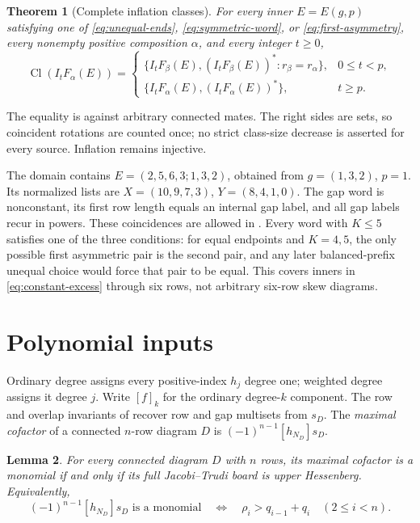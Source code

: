 \documentclass[11pt,a4paper]{amsart}
\numberwithin{equation}{section}
\theoremstyle{plain}
\newtheorem{theorem}{Theorem}[section]
\newtheorem{lemma}[theorem]{Lemma}
\theoremstyle{definition}
\begin{document}
\begin{theorem}[Complete inflation classes]\label{thm:main}
For every inner \(E=E(g,p)\) satisfying one of
\eqref{eq:unequal-ends}, \eqref{eq:symmetric-word}, or
\eqref{eq:first-asymmetry}, every nonempty positive composition
\(\alpha\), and every integer \(t\ge0\),
\begin{equation}\label{eq:main-class}
 \operatorname{Cl}(I_tF_\alpha(E))=
 \begin{cases}
 \{I_tF_\beta(E),(I_tF_\beta(E))^*:r_\beta=r_\alpha\},
       &0\le t<p,\\[1mm]
 \{I_tF_\alpha(E),(I_tF_\alpha(E))^*\},&t\ge p.
 \end{cases}
\end{equation}
\end{theorem}

The equality is against arbitrary connected mates.  The right sides are
sets, so coincident rotations are counted once; no strict class-size
decrease is asserted for every source.  Inflation remains injective.

The domain contains \(E=(2,5,6,3;1,3,2)\), obtained from
\(g=(1,3,2)\), \(p=1\).  Its normalized lists are
\(X=(10,9,7,3)\), \(Y=(8,4,1,0)\).  The gap word is
nonconstant, its first row length equals an internal gap label, and all
gap labels recur in powers.  These coincidences are allowed in
.  Every word with \(K\le5\) satisfies one of the
three conditions: for equal endpoints and \(K=4,5\), the only
possible first asymmetric pair is the second pair, and any later
balanced-prefix unequal choice would force that pair to be equal.
This covers inners in \eqref{eq:constant-excess} through six rows,
not arbitrary six-row skew diagrams.

\section{Polynomial inputs}\label{sec:inputs}

Ordinary degree assigns every positive-index \(h_j\) degree one;
weighted degree assigns it degree \(j\).  Write \([f]_k\) for the
ordinary degree-\(k\) component.  The row and overlap invariants of
\cite{Reiner2007Coincidences} recover row and gap multisets from
\(s_D\).  The \emph{maximal cofactor} of a connected \(n\)-row diagram
\(D\) is \((-1)^{n-1}[h_{N_D}]s_D\).

\begin{lemma}\label{lem:hessenberg-membership}
For every connected diagram \(D\) with \(n\) rows, its maximal cofactor
is a monomial if and only if its full Jacobi--Trudi board is upper
Hessenberg.  Equivalently,
\begin{equation}\label{eq:hessenberg-input}
 (-1)^{n-1}[h_{N_D}]s_D\text{ is a monomial}
 \quad\Longleftrightarrow\quad
 \rho_i>q_{i-1}+q_i\quad(2\le i<n).
\end{equation}
\end{lemma}
\end{document}
